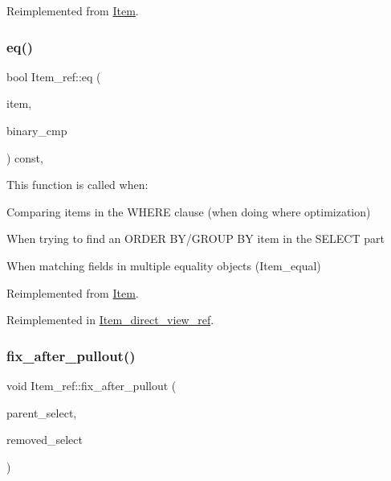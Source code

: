 Reimplemented from \mbox{\hyperlink{classItem}{Item}}.

\mbox{\label{classItem__ref_aeeefca8b7da367005015a5f978e9753b}} 
\subsubsection{\texorpdfstring{eq()}{eq()}}
{\footnotesize\ttfamily bool Item\+\_\+ref\+::eq (\begin{DoxyParamCaption}\item[{const \mbox{\hyperlink{classItem}{Item}} $\ast$}]{item,  }\item[{bool}]{binary\+\_\+cmp }\end{DoxyParamCaption}) const\hspace{0.3cm}{\ttfamily [inline]}, {\ttfamily [virtual]}}

This function is called when\+:
\begin{DoxyItemize}
\item Comparing items in the W\+H\+E\+RE clause (when doing where optimization)
\item When trying to find an O\+R\+D\+ER B\+Y/\+G\+R\+O\+UP BY item in the S\+E\+L\+E\+CT part
\item When matching fields in multiple equality objects (Item\+\_\+equal) 
\end{DoxyItemize}

Reimplemented from \mbox{\hyperlink{classItem_af0957bbdb9a256de0cd29f1adcae28be}{Item}}.



Reimplemented in \mbox{\hyperlink{classItem__direct__view__ref_ae9d8bc691bf2687ea154e83f8943bdf7}{Item\+\_\+direct\+\_\+view\+\_\+ref}}.

\mbox{\label{classItem__ref_a54fdde8c2418171d5f529e24d733f357}} 
\subsubsection{\texorpdfstring{fix\+\_\+after\+\_\+pullout()}{fix\_after\_pullout()}}
{\footnotesize\ttfamily void Item\+\_\+ref\+::fix\+\_\+after\+\_\+pullout (\begin{DoxyParamCaption}\item[{st\+\_\+select\+\_\+lex $\ast$}]{parent\+\_\+select,  }\item[{st\+\_\+select\+\_\+lex $\ast$}]{removed\+\_\+select }\end{DoxyParamCaption})\hspace{0.3cm}{\ttfamily [virtual]}}

